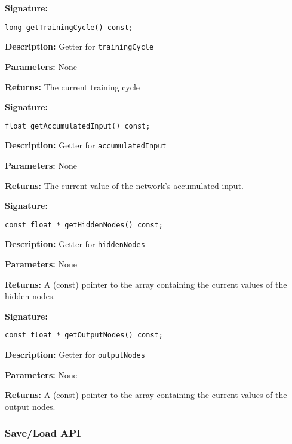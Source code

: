 \documentclass[a4paper]{article}
\begin{document}
\textbf{Signature:} \begin{lstlisting}
long getTrainingCycle() const;
\end{lstlisting}

\textbf{Description: }
Getter for \lstinline{trainingCycle}

\textbf{Parameters: } None

\textbf{Returns: }
The current training cycle

\hrulefill %

\textbf{Signature:} \begin{lstlisting}
float getAccumulatedInput() const;
\end{lstlisting}

\textbf{Description: }
Getter for \lstinline{accumulatedInput}

\textbf{Parameters: } None

\textbf{Returns: }
The current value of the network's accumulated input.

\hrulefill %

\textbf{Signature:} \begin{lstlisting}
const float * getHiddenNodes() const;
\end{lstlisting}

\textbf{Description: }
Getter for \lstinline{hiddenNodes}

\textbf{Parameters: } None

\textbf{Returns: }
A (const) pointer to the array containing the current values of the hidden nodes.

\hrulefill %

\textbf{Signature:} \begin{lstlisting}
const float * getOutputNodes() const;
\end{lstlisting}

\textbf{Description: }
Getter for \lstinline{outputNodes}

\textbf{Parameters: } None

\textbf{Returns: }
A (const) pointer to the array containing the current values of the output nodes.

\hrulefill %

\subsubsection{Save/Load API}%
\end{document}
